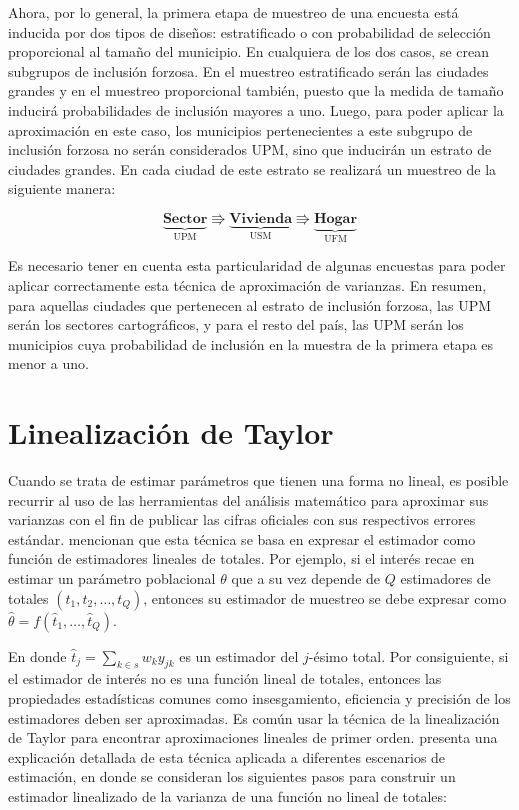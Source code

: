 \documentclass[
  12pt,
]{book}
\begin{document}
Ahora, por lo general, la primera etapa de muestreo de una encuesta está inducida por dos tipos de diseños: estratificado o con probabilidad de selección proporcional al tamaño del municipio. En cualquiera de los dos casos, se crean subgrupos de inclusión forzosa. En el muestreo estratificado serán las ciudades grandes y en el muestreo proporcional también, puesto que la medida de tamaño inducirá probabilidades de inclusión mayores a uno. Luego, para poder aplicar la aproximación en este caso, los municipios pertenecientes a este subgrupo de inclusión forzosa no serán considerados UPM, sino que inducirán un estrato de ciudades grandes. En cada ciudad de este estrato se realizará un muestreo de la siguiente manera:

\begin{equation*}
\underbrace{\textbf{Sector}}_{\text{UPM}} \Rrightarrow
\underbrace{\textbf{Vivienda}}_{\text{USM}} \Rrightarrow
\underbrace{\textbf{Hogar}}_{\text{UFM}}
\end{equation*}

Es necesario tener en cuenta esta particularidad de algunas encuestas para poder aplicar correctamente esta técnica de aproximación de varianzas. En resumen, para aquellas ciudades que pertenecen al estrato de inclusión forzosa, las UPM serán los sectores cartográficos, y para el resto del país, las UPM serán los municipios cuya probabilidad de inclusión en la muestra de la primera etapa es menor a uno.

\hypertarget{linealizaciuxf3n-de-taylor}{%
\section{Linealización de Taylor}\label{linealizaciuxf3n-de-taylor}}

Cuando se trata de estimar parámetros que tienen una forma no lineal, es posible recurrir al uso de las herramientas del análisis matemático para aproximar sus varianzas con el fin de publicar las cifras oficiales con sus respectivos errores estándar. \citet{Valliant_Dever_Kreuter_2013} mencionan que esta técnica se basa en expresar el estimador como función de estimadores lineales de totales. Por ejemplo, si el interés recae en estimar un parámetro poblacional \(\theta\) que a su vez depende de \(Q\) estimadores de totales \((t_1, t_2, \ldots, t_Q)\), entonces su estimador de muestreo se debe expresar como \(\hat{\theta}=f(\hat{t}_1, \ldots, \hat{t}_Q)\).

En donde \(\hat{t}_j=\sum_{k\in s}w_k y_{jk}\) es un estimador del \(j\)-ésimo total. Por consiguiente, si el estimador de interés no es una función lineal de totales, entonces las propiedades estadísticas comunes como insesgamiento, eficiencia y precisión de los estimadores deben ser aproximadas. Es común usar la técnica de la linealización de Taylor para encontrar aproximaciones lineales de primer orden. \citet[capitulo 8]{Gutierrez_2016} presenta una explicación detallada de esta técnica aplicada a diferentes escenarios de estimación, en donde se consideran los siguientes pasos para construir un estimador linealizado de la varianza de una función no lineal de totales:
\end{document}
